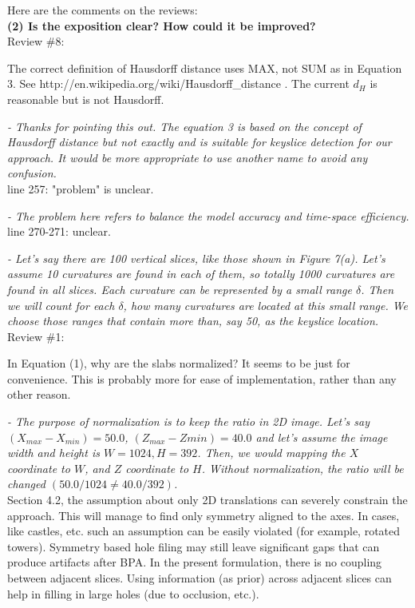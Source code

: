 \documentclass[12pt,letterpaper]{article}
\begin{document}
Here are the comments on the reviews:\\

\textbf{ (2) Is the exposition clear? How could it be improved?} \\

Review \#8: 


The correct definition of Hausdorff distance uses MAX, not SUM as in Equation 3. See
http://en.wikipedia.org/wiki/Hausdorff\_distance . The current $d_H$ is reasonable but is
not Hausdorff.

{\it  - Thanks for pointing this out. The equation 3 is based on the concept of Hausdorff distance 
but not exactly and is suitable for keyslice detection for our approach. 
It would be more appropriate to use another name to avoid any confusion. } \\

line 257: "problem" is unclear.

{\it  - The problem here refers to balance the model accuracy and time-space efficiency.} \\


line 270-271: unclear.

{\it  - Let's say there are 100 vertical slices, like those shown in Figure 7(a). 
Let's assume 10 curvatures are found in each of them, so totally 1000 curvatures are found in all slices. 
Each curvature can be represented by a small range $\delta$. 
Then we will count for each $\delta$, how many curvatures are located at this small range. 
We choose those ranges that contain more than, say 50, as the keyslice location.} \\


Review \#1:


In Equation (1), why are the slabs normalized? It seems to be just for convenience.
This is probably more for ease of implementation, rather than any other reason.

{\it - The purpose of normalization is to keep the ratio in 2D image. Let's say $(X_{max} - X_{min}) = 50.0$,
$(Z_{max} - Z{min}) = 40.0$ and let's assume the image width and height is $W = 1024, H = 392$. Then, we
would mapping the $X$ coordinate to $W$, and $Z$ coordinate to $H$. Without normalization, the ratio will
be changed $(50.0/1024 \neq 40.0/392)$.} \\


Section 4.2, the assumption about only 2D translations can severely constrain the
approach. This will manage to find only symmetry aligned to the axes. In cases, like
castles, etc. such an assumption can be easily violated (for example, rotated towers).
Symmetry based hole filing may still leave significant gaps that can produce artifacts
after BPA. In the present formulation, there is no coupling between adjacent slices.
Using information (as prior) across adjacent slices can help in filling in large holes
(due to occlusion, etc.). 
\end{document}

